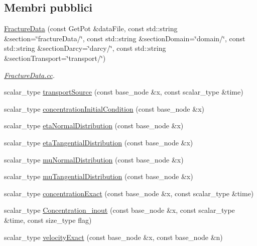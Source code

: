 \subsection*{Membri pubblici}
\begin{DoxyCompactItemize}
\item 
\hyperlink{classFractureData_a8ba0cab6a95b57a37f1c965b22ed37c0}{Fracture\-Data} (const Get\-Pot \&data\-File, const std\-::string \&section=\char`\"{}fracture\-Data/\char`\"{}, const std\-::string \&section\-Domain=\char`\"{}domain/\char`\"{}, const std\-::string \&section\-Darcy=\char`\"{}darcy/\char`\"{}, const std\-::string \&section\-Transport=\char`\"{}transport/\char`\"{})
\begin{DoxyCompactList}\small\item\em \hyperlink{FractureData_8cc}{Fracture\-Data.\-cc}. \end{DoxyCompactList}\item 
scalar\-\_\-type \hyperlink{classFractureData_a31383de9b3236dd9a2af7b113cab88eb}{transport\-Source} (const base\-\_\-node \&x, const scalar\-\_\-type \&time)
\item 
scalar\-\_\-type \hyperlink{classFractureData_acf5e3a5d756aaf5b1ec7f446f388cf15}{concentration\-Initial\-Condition} (const base\-\_\-node \&x)
\item 
scalar\-\_\-type \hyperlink{classFractureData_a0aaeeb3d9eedd46175759cd6b9536484}{eta\-Normal\-Distribution} (const base\-\_\-node \&x)
\item 
scalar\-\_\-type \hyperlink{classFractureData_a0f989b64832a1f0fc77632c6803f102c}{eta\-Tangential\-Distribution} (const base\-\_\-node \&x)
\item 
scalar\-\_\-type \hyperlink{classFractureData_a4ae566f9148893e47279097cab215e7b}{mu\-Normal\-Distribution} (const base\-\_\-node \&x)
\item 
scalar\-\_\-type \hyperlink{classFractureData_a9a3e1a75231b55be01ad198b824c0d56}{mu\-Tangential\-Distribution} (const base\-\_\-node \&x)
\item 
scalar\-\_\-type \hyperlink{classFractureData_a362710c6c9008fde0d358069eb2808d8}{concentration\-Exact} (const base\-\_\-node \&x, const scalar\-\_\-type \&time)
\item 
scalar\-\_\-type \hyperlink{classFractureData_ab4d202a7f72611e4bc41a5e081b32f2c}{Concentration\-\_\-inout} (const base\-\_\-node \&x, const scalar\-\_\-type \&time, const size\-\_\-type flag)
\item 
scalar\-\_\-type \hyperlink{classFractureData_a8342142df05ded99f3a6c8d39dbfdc0e}{velocity\-Exact} (const base\-\_\-node \&x, const base\-\_\-node \&n)

\end{DoxyCompactItemize}
